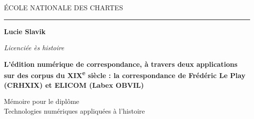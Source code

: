 \begin{titlepage}
    \begin{center}

        \bigskip
    
        \begin{large}
            \'ECOLE NATIONALE DES CHARTES 
        \end{large}
    
        \begin{center}
            \rule{4cm}{0.02cm}
        \end{center}
    
        \hugeskip
        \bigskip
        
        \begin{Large}
             \textbf{Lucie Slavik}\\
        \end{Large}
        \begin{normalsize}
            \textit{Licenciée ès histoire}\\
        \end{normalsize}
        
        \hugeskip
        \hugeskip
        \hugeskip
        
        \begin{Huge}
        \begin{spacing}{1.5}
            \textbf{L’édition numérique de correspondance, à travers deux applications sur des corpus du XIX\textsuperscript{e} siècle : la correspondance de Frédéric Le Play (CRHXIX) et ELICOM (Labex OBVIL) }
            \end{spacing}
        \end{Huge}
        \bigskip
        \bigskip
        
        \hugeskip
        \vfill
        
        \begin{large}
            Mémoire pour le diplôme\\
            \og Technologies numériques appliquées à l'histoire \fg\\
        \end{large}
        
    \end{center}
\end{titlepage}

\thispagestyle{empty}
\cleardoublepage
